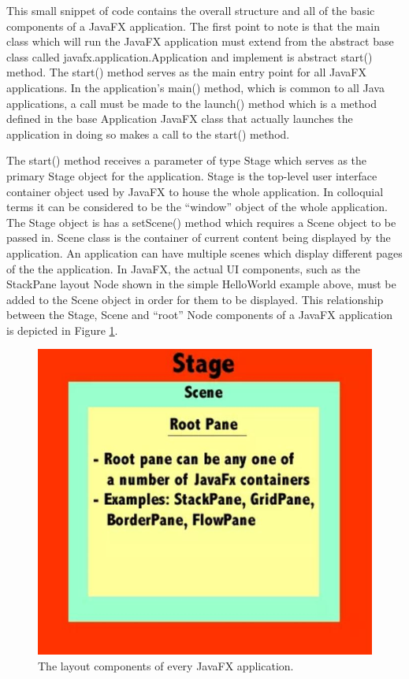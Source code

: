 This small snippet of code contains the overall structure and all of the basic components of a JavaFX application. The first point to note is that the main class which will run the JavaFX application must extend from the abstract base class called javafx.application.Application and implement is abstract start() method. The start() method serves as the main entry point for all JavaFX applications. In the application’s main() method, which is common to all Java applications, a call must be made to the launch() method which is a method defined in the base Application JavaFX class that actually launches the application in doing so makes a call to the start() method. 

The start() method receives a parameter of type Stage which serves as the primary Stage object for the application. Stage is the top-level user interface container object used by JavaFX to house the whole application. In colloquial terms it can be considered to be the “window” object of the whole application. The Stage object is has a setScene() method which requires a Scene object to be passed in. Scene class is the container of current content being displayed by the application. An application can have multiple scenes which display different pages of the the application. In JavaFX, the actual UI components, such as the StackPane layout Node shown in the simple HelloWorld example above, must be added to the Scene object in order for them to be displayed. This relationship between the Stage, Scene and “root” Node components of a JavaFX application is depicted in Figure \ref{fig:stageSceneRoot}.
\begin{figure}[th]
\centering
\includegraphics[scale=0.5]{Figures/stageSceneRoot.JPG}
\caption{The layout components of every JavaFX application.}
\label{fig:stageSceneRoot}
\end{figure}


